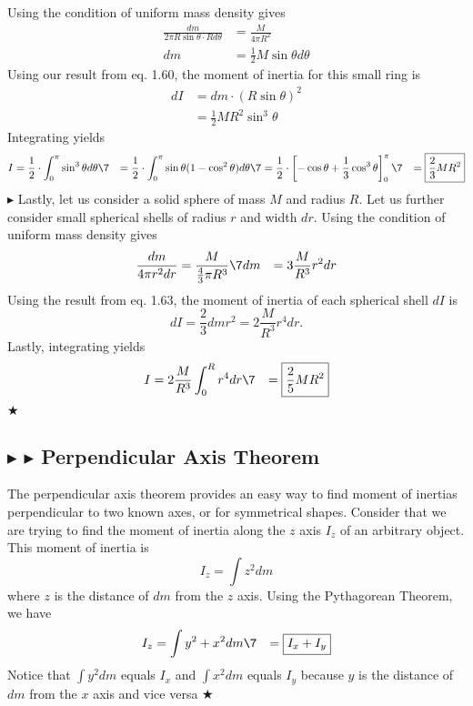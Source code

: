 \noindent Using the condition of uniform mass density gives
\begin{align*}
    \frac{dm}{2\pi R\sin\theta \cdot Rd\theta} &= \frac{M}{4\pi R^2} \\
    dm &= \frac12 M \sin\theta d\theta
\end{align*}
\noindent Using our result from eq. 1.60, the moment of inertia for this small ring is 
\begin{align*}
    dI &= dm \cdot (R\sin\theta)^2 \\
    &= \frac12 MR^2 \sin^3\theta
\end{align*}
\noindent Integrating yields
\begin{align}
    I &= \frac12 \cdot \int_0^\pi \sin^3 \theta d\theta \7
    &= \frac12 \cdot \int_0^\pi \sin\theta(1-\cos^2\theta) d\theta \7
    &= \frac12 \cdot \left[-\cos\theta +\frac13 \cos^3\theta\right]_0^\pi \7
    &= \boxed{\frac23 MR^2}
\end{align}
\noindent $\blacktriangleright$ Lastly, let us consider a solid sphere of mass $M$ and radius $R$. Let us further consider small spherical shells of radius $r$ and width $dr$. Using the condition of uniform mass density gives
\begin{align*}
    \frac{dm}{4\pi r^2 dr} &= \frac{M}{\frac43 \pi R^3} \7
    dm &= 3\frac{M}{R^3} r^2 dr
\end{align*}
\noindent Using the result from eq. 1.63, the moment of inertia of each spherical shell $dI$ is
\begin{equation*}
    dI = \frac23 dm r^2 = 2\frac{M}{R^3} r^4 dr.
\end{equation*}
\noindent Lastly, integrating yields
\begin{align}
    I &= 2\frac{M}{R^3} \int_0^R r^4 dr \7
    &= \boxed{\frac25 MR^2}
\end{align}
$\bigstar$

%
%
\subsection{\color{Goldenrod} $\blacktriangleright$ \color{Orchid} $\blacktriangleright$ \color{black} Perpendicular Axis Theorem}
The perpendicular axis theorem provides an easy way to find moment of inertias perpendicular to two known axes, or for symmetrical shapes. Consider that we are trying to find the moment of inertia along the $z$ axis $I_z$ of an arbitrary object. This moment of inertia is
\begin{equation*}
    I_z = \int z^2 dm
\end{equation*}
\noindent where $z$ is the distance of $dm$ from the $z$ axis. Using the Pythagorean Theorem, we have
\begin{align}
    I_z &= \int y^2 + x^2 dm \7
    &= \boxed{I_x + I_y}
\end{align}
\noindent Notice that $\int y^2 dm$ equals $I_x$ and $\int x^2 dm$ equals $I_y$ because $y$ is the distance of $dm$ from the $x$ axis and vice versa $\bigstar$

